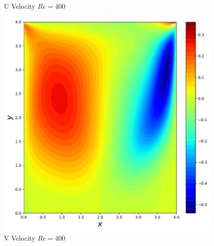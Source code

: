 \documentclass{article}
\begin{document}
\begin{figure}[htb!]
      \caption{U Velocity $Re = 400$}
	  \label{fig:u_example1}
    \endminipage\hfill
      \includegraphics[width=\linewidth]{./images/Re400FlowPy_pres_v}
      \caption{V Velocity $Re = 400$}
	 \label{fig:v_example1}
    \endminipage
    \end{figure}
\end{document}

